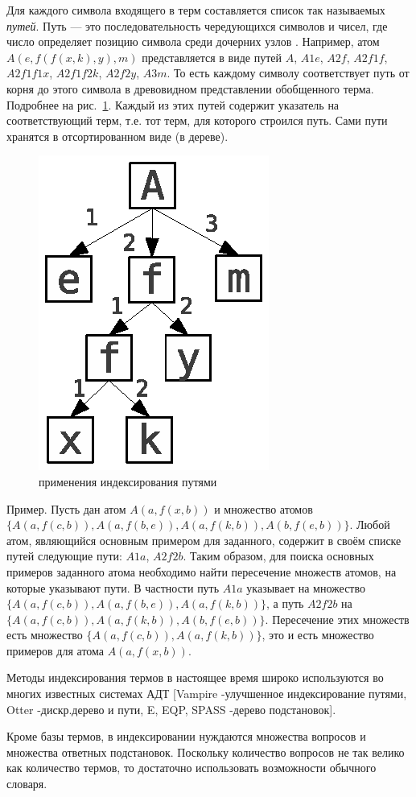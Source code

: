 Для каждого символа входящего в терм составляется список так называемых \emph{путей}. Путь --- это последовательность чередующихся символов и чисел, где число определяет позицию символа среди дочерних узлов \cite{disctree}. Например, атом $A(e,f(f(x,k),y),m)$ представляется в виде путей $A$, $A1e$, $A2f$, $A2f1f$, $A2f1f1x$, $A2f1f2k$, $A2f2y$, $A3m$. То есть каждому символу соответствует путь от корня до этого символа в древовидном представлении обобщенного терма. Подробнее на рис.~\ref{pathfig}. Каждый из этих путей содержит указатель на соответствующий терм, т.е. тот терм, для которого строился путь. Сами пути хранятся в отсортированном виде (в дереве).
\begin{figure}[h]
	\centering
	\includegraphics[width=0.2\linewidth]{pics/Path1.eps}
	\caption{ применения индексирования путями}
	\label{pathfig}
\end{figure}

Пример. Пусть дан атом $A(a,f(x,b))$ и множество атомов $\{A(a,f(c,b)), A(a,f(b,e)),A(a,f(k,b)), A(b,f(e,b))\}$. Любой атом, являющийся основным примером для заданного, содержит в своём списке путей следующие пути: $A1a$, $A2f2b$. Таким образом, для поиска основных примеров заданного атома необходимо найти пересечение множеств атомов, на которые указывают пути.  В частности путь $A1a$ указывает на множество $\{A(a,f(c,b)), A(a,f(b,e)),A(a,f(k,b))\}$, а путь $A2f2b$ на $\{A(a,f(c,b)), A(a,f(k,b)), A(b,f(e,b))\}$. Пересечение этих множеств есть множество $\{A(a,f(c,b)),A(a,f(k,b))\}$, это и есть множество примеров для атома $A(a,f(x,b))$.

Методы индексирования термов в настоящее время широко используются во многих известных системах АДТ [Vampire -улучшенное индексирование путями, Otter -дискр.дерево и пути, E, EQP, SPASS -дерево подстановок].

Кроме базы термов, в индексировании нуждаются множества вопросов и множества ответных подстановок. Поскольку количество вопросов не так велико как количество термов, то достаточно использовать возможности обычного словаря.

